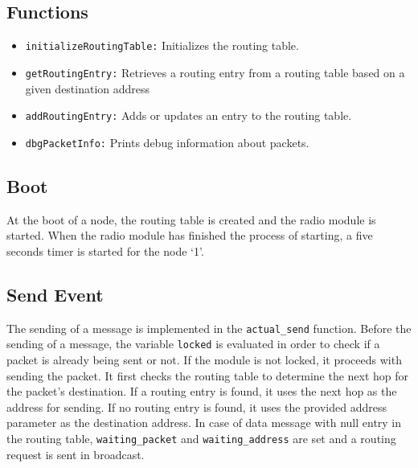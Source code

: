 \documentclass[11pt]{article}
\begin{document}
\subsection*{Functions}
\begin{itemize}
	\item{\texttt{initializeRoutingTable:}} Initializes the routing table.
	\item{\texttt{getRoutingEntry:}} Retrieves a routing entry from a routing table based on a given destination address
	\item{\texttt{addRoutingEntry:}} Adds or updates an entry to the routing table. 
	\item{\texttt{dbgPacketInfo:}} Prints debug information about packets.
\end{itemize}
\subsection*{Boot}
At the boot of a node, the routing table is created and the radio module is started. When the radio module has finished the process of starting, a five seconds timer is started for the node `1'.
\subsection*{Send Event}
The sending of a message is implemented in the 	\texttt{actual\_send} function.
Before the sending of a message, the variable \texttt{locked} is evaluated in order to check if a packet is already being sent or not.
If the module is not locked, it proceeds with sending the packet. It first checks the routing table to determine the next hop for the packet's destination. If a routing entry is found, it uses the next hop as the address for sending. If no routing entry is found, it uses the provided address parameter as the destination address.
In case of data message with null entry in the routing table, \texttt{waiting\_packet} and \texttt{waiting\_address} are set and a routing request is sent in broadcast.
\end{document}
